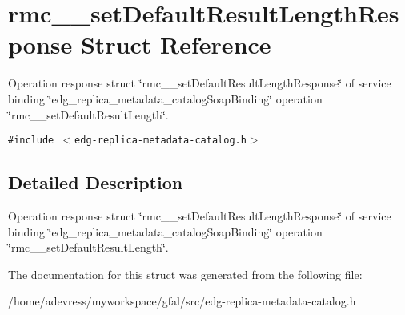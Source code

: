 \section{rmc\_\-\_\-set\-Default\-Result\-Length\-Response Struct Reference}
\label{structrmc____setDefaultResultLengthResponse}
Operation response struct \char`\"{}rmc\_\-\_\-set\-Default\-Result\-Length\-Response\char`\"{} of service binding \char`\"{}edg\_\-replica\_\-metadata\_\-catalog\-Soap\-Binding\char`\"{} operation \char`\"{}rmc\_\-\_\-set\-Default\-Result\-Length\char`\"{}.  


{\tt \#include $<$edg-replica-metadata-catalog.h$>$}



\subsection{Detailed Description}
Operation response struct \char`\"{}rmc\_\-\_\-set\-Default\-Result\-Length\-Response\char`\"{} of service binding \char`\"{}edg\_\-replica\_\-metadata\_\-catalog\-Soap\-Binding\char`\"{} operation \char`\"{}rmc\_\-\_\-set\-Default\-Result\-Length\char`\"{}. 



The documentation for this struct was generated from the following file:\begin{CompactItemize}
\item 
/home/adevress/myworkspace/gfal/src/edg-replica-metadata-catalog.h\end{CompactItemize}
